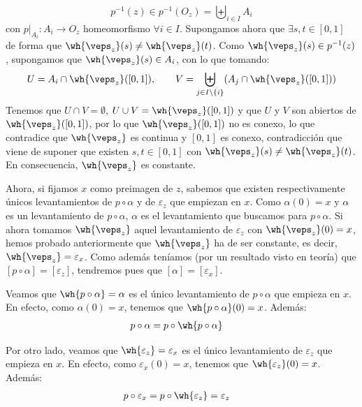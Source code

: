 \begin{ejercicio}
\begin{description}
\begin{description}
\begin{description}
                \begin{equation*}
                    p^{-1}(z) \in p^{-1}(O_z) = \biguplus_{i \in I}A_i
                \end{equation*}
                con $p\big|_{A_i}:A_i\to O_z$ homeomorfismo $\forall i \in I$. Supongamos ahora que $\exists s,t\in [0,1]$ de forma que $\wh{\veps_z}(s)\neq \wh{\veps_z}(t)$. Como $\wh{\veps_z}(s)\in p^{-1}(z)$, supongamos que $\wh{\veps_z}(s) \in  A_i$, con lo que tomando: 
                \begin{equation*}
                    U = A_i\cap \wh{\veps_z}([0,1]), \qquad V = \biguplus_{j \in I\setminus\{i\}}(A_j \cap \wh{\veps_z}([0,1]))
                \end{equation*}
                Tenemos que $U\cap V = \emptyset $, $U\cup V = \wh{\veps_z}([0,1])$ y que $U$ y $V$ son abiertos de $\wh{\veps_z}([0,1])$, por lo que $\wh{\veps_z}([0,1])$ no es conexo, lo que contradice que $\wh{\veps_z}$ es continua y $[0,1]$ es conexo, contradicción que viene de suponer que existen $s,t\in [0,1]$ con $\wh{\veps_z}(s) \neq \wh{\veps_z}(t)$. En consecuencia, $\wh{\veps_z}$ es constante.
            \end{description}
            Ahora, si fijamos $x$ como preimagen de $z$, sabemos que existen respectivamente únicos levantamientos de $p\circ \alpha$ y de $\varepsilon_z$ que empiezan en $x$. Como $\alpha(0) = x$ y $\alpha$ es un levantamiento de $p\circ \alpha$, $\alpha$ es el levantamiento que buscamos para $p\circ \alpha$. Si ahora tomamos $\wh{\veps_z}$ aquel levantamiento de $\varepsilon_z$ con $\wh{\veps_z}(0)=x$, hemos probado anteriormente que $\wh{\veps_z}$ ha de ser constante, es decir, $\wh{\veps_z} = \varepsilon_x$. Como además teníamos (por un resultado visto en teoría) que $[p\circ \alpha] = [\varepsilon_z]$, tendremos pues que $[\alpha] = [\varepsilon_x]$.
        

            \item [Opción 2.]
            Veamos que $\wh{p\circ \alpha} = \alpha$ es el único levantamiento de $p\circ \alpha$ que empieza en $x$. En efecto, como $\alpha(0) = x$, tenemos que $\wh{p\circ \alpha}(0) = x$. Además:
            \begin{align*}
                p\circ \alpha &= p\circ \wh{p\circ \alpha}
            \end{align*}

            Por otro lado, veamos que $\wh{\varepsilon_z} = \varepsilon_x$ es el único levantamiento de $\varepsilon_z$ que empieza en $x$. En efecto, como $\varepsilon_x(0) = x$, tenemos que $\wh{\varepsilon_z}(0) = x$. Además:
            \begin{align*}
                p \circ \varepsilon_x &= p\circ \wh{\varepsilon_z} = \varepsilon_z
            \end{align*}


\end{description}
\end{description}
\end{ejercicio}
